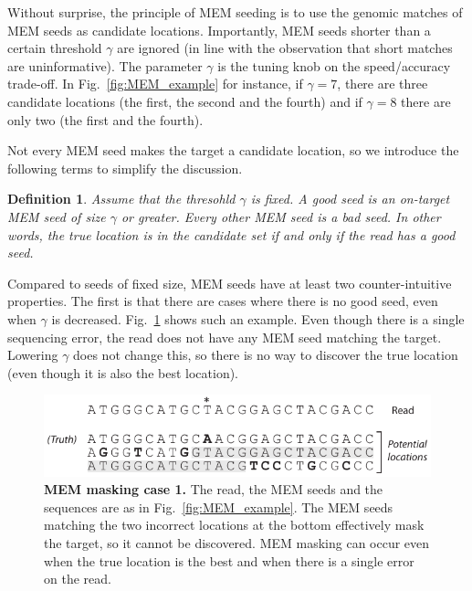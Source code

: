 \documentclass{article}
\newtheorem{definition}{Definition}
\begin{document}
Without surprise, the principle of MEM seeding is to use the genomic
matches of MEM seeds as candidate locations. Importantly, MEM seeds
shorter than a certain threshold $\gamma$ are ignored (in line with the
observation that short matches are uninformative). The parameter $\gamma$
is the tuning knob on the speed/accuracy trade-off. In
Fig.~\ref{fig:MEM_example} for instance, if $\gamma = 7$, there are three
candidate locations (the first, the second and the fourth) and if $\gamma
= 8$ there are only two (the first and the fourth).

Not every MEM seed makes the target a candidate location, so we introduce
the following terms to simplify the discussion.

\begin{definition}
Assume that the thresohld $\gamma$ is fixed. A \emph{good} seed is an
on-target MEM seed of size $\gamma$ or greater. Every other MEM seed is a
\emph{bad} seed. In other words, the true location is in the candidate set
if and only if the read has a good seed.
\end{definition}

Compared to seeds of fixed size, MEM seeds have at least two
counter-intuitive properties. The first is that there are cases where
there is no good seed, even when $\gamma$ is decreased.
Fig.~\ref{fig:full_masking_example} shows such an example. Even though
there is a single sequencing error, the read does not have any MEM seed
matching the target. Lowering $\gamma$ does not change this, so there is
no way to discover the true location (even though it is also the best
location).

\begin{figure}[h]
\centering
\includegraphics[scale=1]{full_masking_example.pdf}
\caption{\textbf{MEM masking case 1.}
The read, the MEM seeds and the sequences are as in
Fig.~\ref{fig:MEM_example}. The MEM seeds matching the two incorrect
locations at the bottom effectively mask the target, so it cannot
be discovered. MEM masking can occur even when the true location is the
best and when there is a single error on the read.}
\label{fig:full_masking_example}
\end{figure}
\end{document}
